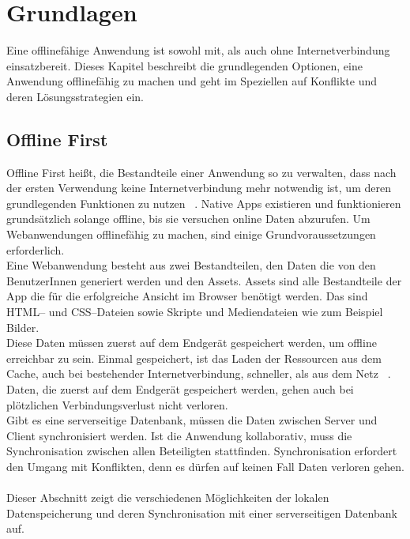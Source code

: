 \chapter{\label{chap:grundlagen}Grundlagen}
Eine offlinefähige Anwendung ist sowohl mit, als auch ohne Internetverbindung einsatzbereit.
Dieses Kapitel beschreibt die grundlegenden Optionen, eine Anwendung offlinefähig zu machen und geht im Speziellen auf Konflikte und deren Lösungsstrategien ein.
%
%
\section{\label{chap:offlinefirst}Offline First}
Offline First heißt, die Bestandteile einer Anwendung so zu verwalten, dass nach der ersten Verwendung keine Internetverbindung mehr notwendig ist, um deren grundlegenden Funktionen zu nutzen ~\cite{offline}.
Native \Glspl{App} existieren und funktionieren grundsätzlich solange offline, bis sie versuchen online Daten abzurufen.
Um Webanwendungen offlinefähig zu machen, sind einige Grundvoraussetzungen erforderlich.\\
Eine Webanwendung besteht aus zwei Bestandteilen, den Daten die von den BenutzerInnen generiert werden und den \gls{Assets}.
\gls{Assets} sind alle Bestandteile der \gls{App} die für die erfolgreiche Ansicht im Browser benötigt werden.
Das sind \gls{HTML}-- und \gls{CSS}--Dateien sowie Skripte und Mediendateien wie zum Beispiel Bilder.\\
Diese Daten müssen zuerst auf dem Endgerät gespeichert werden, um offline erreichbar zu sein.
Einmal gespeichert, ist das Laden der Ressourcen aus dem Cache, auch bei bestehender Internetverbindung, schneller, als aus dem Netz ~\cite{jakearchibald}.
Daten, die zuerst auf dem Endgerät gespeichert werden, gehen auch bei plötzlichen Verbindungsverlust nicht verloren.\\
Gibt es eine serverseitige Datenbank, müssen die Daten zwischen Server und Client synchronisiert werden. Ist die Anwendung kollaborativ, muss die Synchronisation zwischen allen Beteiligten stattfinden. Synchronisation erfordert den Umgang mit Konflikten, denn es dürfen auf keinen Fall Daten verloren gehen.\\\\
Dieser Abschnitt zeigt die verschiedenen Möglichkeiten der lokalen Datenspeicherung und deren Synchronisation mit einer serverseitigen Datenbank auf.
